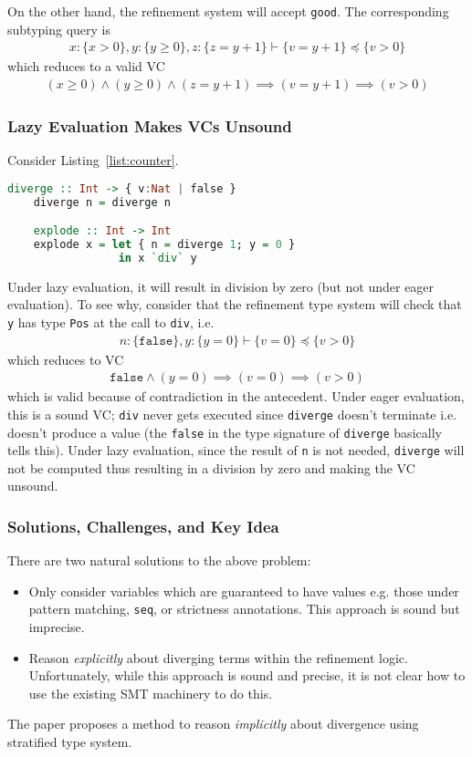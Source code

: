 \documentclass[a4paper,UKenglish]{lipics-v2016}
\begin{document}
On the other hand, the refinement system will accept \texttt{good}.  The
corresponding subtyping query is
\begin{align*}
    x:\{x>0\}, y:\{y\geq0\},z:\{z=y+1\}\vdash\{v=y+1\}\preceq\{v>0\}
\end{align*}
which reduces to a valid VC
\begin{align*}
    (x\geq0)\wedge(y\geq0)\wedge(z=y+1)\implies(v=y+1)\implies(v>0)
\end{align*}

\subsubsection{Lazy Evaluation Makes VCs Unsound}
Consider Listing~\ref{list:counter}.  
\begin{lstlisting}[caption={Lazy evaluation breaks VC},float,captionpos=t,label={list:counter},language=haskell,abovecaptionskip=-\medskipamount]
    diverge :: Int -> { v:Nat | false } 
    diverge n = diverge n

    explode :: Int -> Int
    explode x = let { n = diverge 1; y = 0 }
                 in x `div` y
\end{lstlisting}
Under lazy evaluation, it will result in division by zero (but not under eager
evaluation).  To see why, consider that the refinement type system will check
that \texttt{y} has type \texttt{Pos} at the call to \texttt{div}, i.e.
\begin{align*}
    n:\{\mathtt{false}\},y:\{y=0\}\vdash\{v=0\}\preceq\{v>0\}
\end{align*}
which reduces to VC
\begin{align*}
    \mathtt{false}\wedge(y=0)\implies(v=0)\implies(v>0)
\end{align*}
which is valid because of contradiction in the antecedent.  Under eager
evaluation, this is a sound VC; \texttt{div} never gets executed since
\texttt{diverge} doesn't terminate i.e. doesn't produce a value (the
\texttt{false} in the type signature of \texttt{diverge} basically tells this).
Under lazy evaluation, since the result of \texttt{n} is not needed,
\texttt{diverge} will not be computed thus resulting in a division by zero and
making the VC unsound.

\subsubsection{Solutions, Challenges, and Key Idea}
There are two natural solutions to the above problem:
\begin{itemize}
    \item Only consider variables which are guaranteed to have values e.g.
        those under pattern matching, \texttt{seq}, or strictness annotations.
        This approach is sound but imprecise.
    \item Reason \emph{explicitly} about diverging terms within the refinement
        logic.  Unfortunately, while this approach is sound and precise, it is
        not clear how to use the existing SMT machinery to do this.
\end{itemize}
The paper proposes a method to reason \emph{implicitly} about divergence using
stratified type system.
\end{document}
